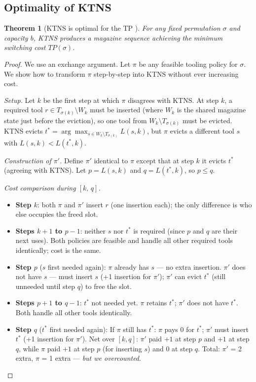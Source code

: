 \documentclass[11pt,a4paper]{article}
\theoremstyle{plain}
\newtheorem{theorem}{Theorem}[section]
\theoremstyle{definition}
\begin{document}
\subsection{Optimality of KTNS}

\begin{thmbox}
\begin{theorem}[KTNS is optimal for the TP \cite{Tang1988}]
\label{thm:ktns}
For any fixed permutation $\sigma$ and capacity $b$, KTNS produces a magazine
sequence achieving the minimum switching cost $TP(\sigma)$.
\end{theorem}
\end{thmbox}

\begin{proofbox}
\begin{proof}
We use an exchange argument.
Let $\pi$ be any feasible tooling policy for $\sigma$.
We show how to transform $\pi$ step-by-step into KTNS without ever increasing cost.

\medskip
\noindent\textit{Setup.}
Let $k$ be the first step at which $\pi$ disagrees with KTNS.
At step $k$, a required tool $r \in T_{\sigma(k)} \setminus W_k$ must be inserted
(where $W_k$ is the shared magazine state just before the eviction), so one tool
from $W_k \setminus T_{\sigma(k)}$ must be evicted.
KTNS evicts $t^* = \arg\max_{s \in W_k \setminus T_{\sigma(k)}} L(s,k)$,
but $\pi$ evicts a different tool $s$ with $L(s,k) < L(t^*,k)$.

\medskip
\noindent\textit{Construction of $\pi'$.}
Define $\pi'$ identical to $\pi$ except that at step $k$ it evicts $t^*$ (agreeing
with KTNS). Let $p = L(s,k)$ and $q = L(t^*,k)$, so $p \le q$.

\medskip
\noindent\textit{Cost comparison during $[k,\,q]$.}
\begin{itemize}
\item \textbf{Step $k$}: both $\pi$ and $\pi'$ insert $r$ (one insertion each);
  the only difference is who else occupies the freed slot.
\item \textbf{Steps $k{+}1$ to $p{-}1$}: neither $s$ nor $t^*$ is required
  (since $p$ and $q$ are their next uses). Both policies are feasible and handle
  all other required tools identically; cost is the same.
\item \textbf{Step $p$} ($s$ first needed again):
  $\pi$ already has $s$ — no extra insertion.
  $\pi'$ does not have $s$ — must insert $s$ (+1 insertion for $\pi'$);
  $\pi'$ can evict $t^*$ (still unneeded until step $q$) to free the slot.
\item \textbf{Steps $p{+}1$ to $q{-}1$}: $t^*$ not needed yet. $\pi$ retains $t^*$;
  $\pi'$ does not have $t^*$. Both handle all other tools identically.
\item \textbf{Step $q$} ($t^*$ first needed again):
  If $\pi$ still has $t^*$: $\pi$ pays 0 for $t^*$; $\pi'$ must insert $t^*$
  (+1 insertion for $\pi'$).
  Net over $[k,q]$: $\pi'$ paid $+1$ at step $p$ and $+1$ at step $q$, while $\pi$
  paid $+1$ at step $p$ (for inserting $s$) and $0$ at step $q$.
  Total: $\pi'$ = 2 extra, $\pi$ = 1 extra — \textit{but we overcounted}.
\end{itemize}


\end{proof}
\end{proofbox}
\end{document}
